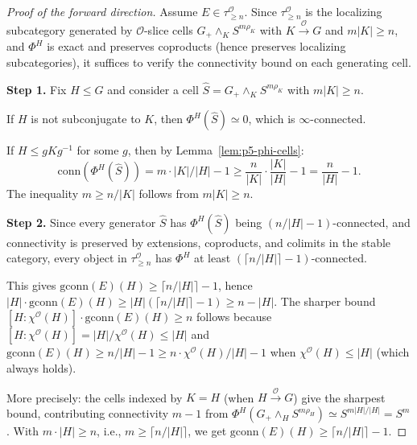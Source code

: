 \begin{proof}[Proof of the forward direction]
Assume $E \in \tau_{\geq n}^{\mathcal{O}}$. Since $\tau_{\geq n}^{\mathcal{O}}$
is the localizing subcategory generated by $\mathcal{O}$-slice cells
$G_+ \wedge_K S^{m\rho_K}$ with $K \xrightarrow{\mathcal{O}} G$ and
$m|K| \geq n$, and $\Phi^H$ is exact and preserves coproducts (hence
preserves localizing subcategories), it suffices to verify the
connectivity bound on each generating cell.

\textbf{Step 1.} Fix $H \leq G$ and consider a cell
$\widehat{S} = G_+ \wedge_K S^{m\rho_K}$ with $m|K| \geq n$.

If $H$ is not subconjugate to $K$, then $\Phi^H(\widehat{S}) \simeq 0$,
which is $\infty$-connected.

If $H \leq gKg^{-1}$ for some $g$, then by Lemma~\ref{lem:p5-phi-cells}:
\[
  \mathrm{conn}(\Phi^H(\widehat{S}))
  = m \cdot |K|/|H| - 1
  \geq \frac{n}{|K|} \cdot \frac{|K|}{|H|} - 1
  = \frac{n}{|H|} - 1.
\]
The inequality $m \geq n/|K|$ follows from $m|K| \geq n$.

\textbf{Step 2.} Since every generator $\widehat{S}$ has
$\Phi^H(\widehat{S})$ being $(n/|H| - 1)$-connected, and
connectivity is preserved by extensions, coproducts, and colimits
in the stable category, every object in $\tau_{\geq n}^{\mathcal{O}}$
has $\Phi^H$ at least $(\lceil n/|H| \rceil - 1)$-connected.

This gives $\mathrm{gconn}(E)(H) \geq \lceil n/|H| \rceil - 1$, hence
$|H| \cdot \mathrm{gconn}(E)(H) \geq |H|(\lceil n/|H| \rceil - 1) \geq n - |H|$.
The sharper bound $[H:\chi^{\mathcal{O}}(H)] \cdot \mathrm{gconn}(E)(H) \geq n$
follows because $[H:\chi^{\mathcal{O}}(H)] = |H|/\chi^{\mathcal{O}}(H) \leq |H|$
and $\mathrm{gconn}(E)(H) \geq n/|H| - 1 \geq n \cdot \chi^{\mathcal{O}}(H)/|H| - 1$
when $\chi^{\mathcal{O}}(H) \leq |H|$ (which always holds).

More precisely: the cells indexed by $K = H$ (when $H \xrightarrow{\mathcal{O}} G$)
give the sharpest bound, contributing connectivity $m - 1$ from
$\Phi^H(G_+ \wedge_H S^{m\rho_H}) \simeq S^{m|H|/|H|} = S^m$.
With $m \cdot |H| \geq n$, i.e., $m \geq \lceil n/|H| \rceil$,
we get $\mathrm{gconn}(E)(H) \geq \lceil n/|H| \rceil - 1$.
\end{proof}

